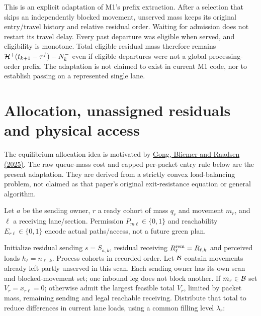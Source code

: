 \documentclass[10pt,a4paper]{article}
\newenvironment{revision}{\begingroup\color{revisionred}}{\par\endgroup}
\begin{document}
This is an explicit adaptation of M1's prefix extraction. After a
selection that skips an independently blocked movement, unserved mass
keeps its original entry/travel history and relative residual order.
Waiting for admission does not restart its travel delay. Every past departure was eligible when served, and eligibility
is monotone. Total eligible residual mass therefore remains
${\cal H}^+(t_{k+1}-\tau^f)-N^-_k$ even if eligible departures were not
a global processing-order prefix. The adaptation is not claimed to exist
in current M1 code, nor to establish passing on a represented single lane.

\section{Allocation, unassigned residuals and physical access}

\begin{revision}
The equilibrium allocation idea is motivated by
\href{https://doi.org/10.1016/j.trb.2025.103208}{Gong, Bliemer and Raadsen (2025)}.
The raw queue-mass cost and capped per-packet entry rule below are the
present adaptation. They are derived from a strictly convex load-balancing
problem, not claimed as that paper's original exit-resistance equation
or general algorithm.
\end{revision}

Let $a$ be the sending owner, $r$ a ready cohort of mass $q_r$ and
movement $m_r$, and $\ell$ a receiving lane/section.
Permission $P_{m\ell}\in\{0,1\}$ and reachability
$E_{r\ell}\in\{0,1\}$ encode actual paths/access, not a future green plan.

Initialize residual sending $s=S_{a,k}$, residual receiving
$R^{\rm rem}_\ell=R_{\ell,k}$ and perceived loads $h_\ell=n_{\ell,k}$.
Process cohorts in recorded order. Let ${\cal B}$ contain movements
already left partly unserved in this scan. Each sending owner has its own
scan and blocked-movement set; one inbound leg does not block another.
If $m_r\in{\cal B}$ set $V_r=x_{r\ell}=0$; otherwise admit the largest
feasible total $V_r$, limited by packet mass, remaining sending and
legal reachable receiving. Distribute that total to reduce differences
in current lane loads, using a common filling level $\lambda_r$:
\end{document}
